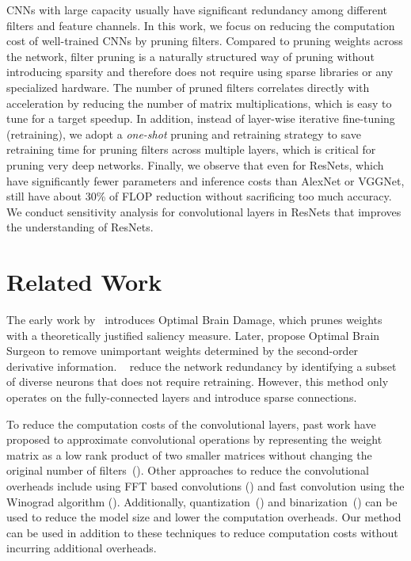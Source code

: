 \documentclass{article} \usepackage{iclr2017_conference,times}
\begin{document}
CNNs with large capacity usually have significant redundancy among different filters and feature channels. 
In this work, we focus on reducing the computation cost of well-trained CNNs by pruning filters. 
Compared to pruning weights across the network, filter pruning is a naturally structured way of pruning without introducing sparsity and therefore does not require using sparse libraries or any specialized hardware.
The number of pruned filters correlates directly with acceleration by reducing the number of matrix multiplications, which is easy to tune for a target speedup.
In addition, instead of layer-wise iterative fine-tuning (retraining), we adopt a \emph{one-shot} pruning and retraining strategy to save retraining time for pruning filters across multiple layers, which is critical for pruning very deep networks. 
Finally, we observe that even for ResNets, which have significantly fewer parameters and inference costs than AlexNet or VGGNet, still have about 30\% of FLOP reduction without sacrificing too much accuracy.
We conduct sensitivity analysis for convolutional layers in ResNets that improves the understanding of ResNets.  \section{Related Work}
The early work by~\cite{obd} introduces Optimal Brain Damage, which prunes weights with a theoretically justified saliency measure. 
Later, \cite{OBS} propose Optimal Brain Surgeon to remove unimportant weights determined by the second-order derivative information.
~\cite{mariet2015diversity} reduce the network redundancy by identifying a subset of diverse neurons that does not require retraining.
However, this method only operates on the fully-connected layers and introduce sparse connections.

To reduce the computation costs of the convolutional layers, past work have proposed to approximate convolutional operations by representing the weight matrix as a low rank product of two smaller matrices without changing the original number of filters~(\cite{denil2013predicting,jaderberg2014speeding,zhang2015efficient,zhang2015accelerating,tai2015convolutional,ioannou2015training}).
Other approaches to reduce the convolutional overheads include using FFT based convolutions
(\cite{mathieu2013fast}) and fast convolution using the Winograd algorithm (\cite{lavin2015fast}).
Additionally, quantization~(\cite{deepcompression}) and binarization~(\cite{xnornet,binarynet}) can be used to reduce the model size and lower the computation overheads.
Our method can be used in addition to these techniques to reduce computation costs without incurring additional overheads.
\end{document}
